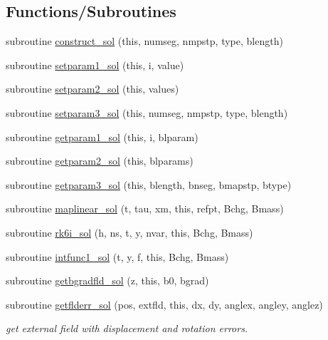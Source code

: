\subsection*{Functions/\+Subroutines}
\begin{DoxyCompactItemize}
\item 
subroutine \mbox{\hyperlink{namespacesolclass_a2307b36cefac8604240e62757dd08cb9}{construct\+\_\+sol}} (this, numseg, nmpstp, type, blength)
\item 
subroutine \mbox{\hyperlink{namespacesolclass_aaec011d4f25d3b03a7e0b42beaa7c9db}{setparam1\+\_\+sol}} (this, i, value)
\item 
subroutine \mbox{\hyperlink{namespacesolclass_a8f2eac99c954759e1b3b6094d8f502fb}{setparam2\+\_\+sol}} (this, values)
\item 
subroutine \mbox{\hyperlink{namespacesolclass_a05dc05d4a94a2e1a71280ff983e62c3e}{setparam3\+\_\+sol}} (this, numseg, nmpstp, type, blength)
\item 
subroutine \mbox{\hyperlink{namespacesolclass_a68e03415e9802b36da3ec9bae72f41b7}{getparam1\+\_\+sol}} (this, i, blparam)
\item 
subroutine \mbox{\hyperlink{namespacesolclass_aab6c073c4b20670742987b17bcb8366d}{getparam2\+\_\+sol}} (this, blparams)
\item 
subroutine \mbox{\hyperlink{namespacesolclass_a11962a787b8bed31dd906ac4a5e2853e}{getparam3\+\_\+sol}} (this, blength, bnseg, bmapstp, btype)
\item 
subroutine \mbox{\hyperlink{namespacesolclass_ac1f4d73224d7585c1be1bb6f24f125df}{maplinear\+\_\+sol}} (t, tau, xm, this, refpt, Bchg, Bmass)
\item 
subroutine \mbox{\hyperlink{namespacesolclass_ae384372c54c045759b9bb9e1eb0886a1}{rk6i\+\_\+sol}} (h, ns, t, y, nvar, this, Bchg, Bmass)
\item 
subroutine \mbox{\hyperlink{namespacesolclass_a195ad6d94c20d0ac4d6ed1c8063a8a3b}{intfunc1\+\_\+sol}} (t, y, f, this, Bchg, Bmass)
\item 
subroutine \mbox{\hyperlink{namespacesolclass_ad89ee3db004c00d4f2e128ddbf03ce32}{getbgradfld\+\_\+sol}} (z, this, b0, bgrad)
\item 
subroutine \mbox{\hyperlink{namespacesolclass_a571ab7b6c8ce4dd9e7eaa2489b874682}{getflderr\+\_\+sol}} (pos, extfld, this, dx, dy, anglex, angley, anglez)
\begin{DoxyCompactList}\small\item\em get external field with displacement and rotation errors. \end{DoxyCompactList}\item 

\end{DoxyCompactItemize}

